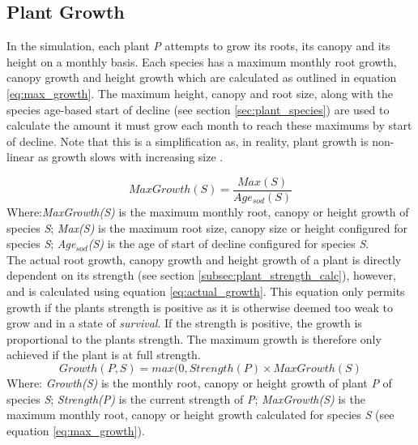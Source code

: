 \subsection{Plant Growth}

In the simulation, each plant \textit{P} attempts to grow its roots, its canopy and its height on a monthly basis. Each species has a maximum monthly root growth, canopy growth and height growth which are calculated as outlined in equation \ref{eq:max_growth}. The maximum height, canopy and root size, along with the species age-based start of decline (see section \ref{sec:plant_species}) are used to calculate the amount it must grow each month to reach these maximums by start of decline. Note that this is a simplification as, in reality, plant growth is non-linear as growth slows with increasing size \cite{Paine2012}.

\begin{equation}
MaxGrowth(S) = \frac{Max(S)}{Age_{sod}(S)}
\label{eq:max_growth}
\end{equation}
Where:\textit{MaxGrowth(S)} is the maximum monthly root, canopy or height growth of species \textit{S}; \textit{Max(S)} is the maximum root size, canopy size or height configured for species \textit{S}; \textit{Age$_{sod}$(S)} is the age of start of decline configured for species \textit{S}.\\

The actual root growth, canopy growth and height growth of a plant is directly dependent on its strength (see section \ref{subsec:plant_strength_calc}), however, and is calculated using equation \ref{eq:actual_growth}. This equation only permits growth if the plants strength is positive as it is otherwise deemed too weak to grow and in a state of \textit{survival}. If the strength is positive, the growth is proportional to the plants strength. The maximum growth is therefore only achieved if the plant is at full strength.\\

\begin{equation}
Growth(\textit{P},S) = max(0, Strength(\textit{P}) \times  MaxGrowth(S)
\label{eq:actual_growth}
\end{equation}
Where: \textit{Growth(S)} is the monthly root, canopy or height growth of plant \textit{P} of species \textit{S}; \textit{Strength(P)} is the current strength of \textit{P}; \textit{MaxGrowth(S)} is the maximum monthly root, canopy or height growth calculated for species \textit{S} (see equation \ref{eq:max_growth}).

